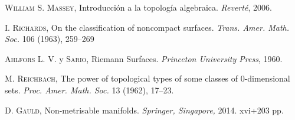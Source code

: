 \documentclass[a4paper,11pt,spanish, twoside, leqno]{tfg-uam}
\theoremstyle{definition}
\begin{document}
\begin{thebibliography}{10}
    \textsc{William S. Massey}, 
    Introducción a la topología algebraica. \textit{Reverté}, 2006.
    
    \textsc{I. Richards},
    On the classification of noncompact surfaces. \textit{Trans. Amer. Math. Soc.} 106 (1963), 259–269

    \textsc{Ahlfors L. V.} y \textsc{Sario},
    Riemann Surfaces. \textit{Princeton University Press}, 1960.

   \textsc{M. Reichbach},
    The power of topological types of some classes of 0-dimensional sets. \textit{Proc. Amer. Math. Soc.} 13 (1962), 17–23.   
    

   \textsc{D. Gauld}, Non-metrisable manifolds. \textit{Springer, Singapore,} 2014. xvi+203 pp. 

    
\end{thebibliography}
\cleardoublepage
\end{document}

